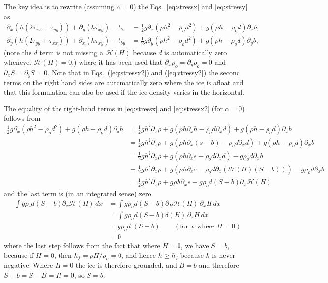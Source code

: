 \documentclass[10pt,a4paper]{book}
\newcommand{\He}{\mathcal{H}}
\newcommand{\p}{\partial}
\newcommand{\tbx}{t_{bx}}
\newcommand{\tby}{t_{by}}
\newcommand{\txx}{\tau_{xx}}
\newcommand{\tyy}{\tau_{yy}}
\newcommand{\txy}{\tau_{xy}}
\begin{document}
The key idea is to rewrite (assuming $\alpha=0$) the Eqs.~\eqref{eq:stressx} and \eqref{eq:stressy} as
\begin{align} 
\p_x ( h ( 2 \txx + \tyy)) +\p_y ( h \txy) - \tbx
&=\frac{1}{2} g \p_x (\rho h^2 - \rho_o d^2)+g(\rho h -\rho_o d) \p_x b ,
\label{eq:stressx2}\\
\p_y (  h ( 2 \tyy + \txx)) +\p_x ( h \txy ) - \tby
&=\frac{1}{2} g \p_y (\rho h^2 - \rho_o d^2)+g(\rho h -\rho_o d) \p_y b ,
\label{eq:stressy2}
\end{align}
(note the $d$ term is not missing a $\He(H)$ because $d$ is automatically zero whenever $\He(H)=0$.)
where it has been used that $\p_x \rho_o=\p_y \rho_o=0$ and $\p_x S
=\p_y S=0$.  Note that in Eqs.~(\ref{eq:stressx2}) and
(\ref{eq:stressy2}) the second terms on the right hand sides are automatically zero
where the ice is afloat and that this formulation can also be used if the
ice density varies in the horizontal.

The equality of the right-hand terms in \eqref{eq:stressx} and
\eqref{eq:stressx2} (for $\alpha=0$) follows from
\begin{align*}
\frac{1}{2} g \p_x (\rho h^2 - \rho_o d^2)+g(\rho h -\rho_o d) \p_x b 
&= \frac{1}{2} g h^2 \p_x \rho + g  ( \rho h \p_x h - \rho_o d \p_x d)+g (\rho h -\rho_o d) \p_x b \\
&= \frac{1}{2} g h^2 \p_x \rho + g  ( \rho h \p_x (s-b) - \rho_o d \p_x d)+g (\rho h -\rho_o d) \p_x b \\
&=\frac{1}{2} g h^2 \p_x \rho + g  ( \rho h \p_x s - \rho_o d \p_x d)-g \rho_o d \p_x b \\
&=\frac{1}{2} g h^2 \p_x \rho + g  ( \rho h \p_x s - \rho_o d \p_x (\He(H) (S-b) ))-g \rho_o d \p_x b \\
&=\frac{1}{2} g h^2 \p_x \rho + g  \rho h \p_x s - g \rho_o d (S-b) \p_x \He(H)   
\end{align*}
and the last term is (in an integrated sense) zero
\begin{align*}
\int g \rho_o d (S-b) \p_x \He(H)  \, dx 
&= \int g \rho_o d (S-b) \p_H \He(H) \, \p_x H \, dx \\   
&= \int g \rho_o d (S-b) \delta(H) \, \p_x H \, dx \\   
&= g \rho_o d \; (S-b)   \qquad ( \text{for $x$ where $H=0$})\\
&=0
\end{align*}  
where the last step follows from the fact that where $H=0$, we have
$S=b$, because if $H=0$, then $h_f=\rho H/\rho_o=0$, and hence
$h \ge h_f$ because $h$ is never negative. Where $H=0$ the ice is therefore
grounded, and $B=b$ and therefore $S-b=S-B=H=0$, so $S=b$.
\end{document}
